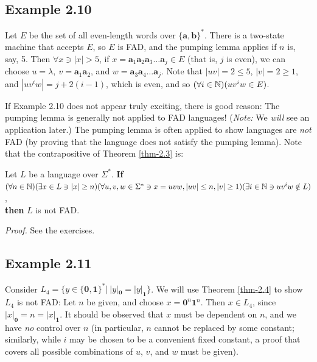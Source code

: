 \subsection*{Example 2.10}

Let $E$ be the set of all even-length words over $\{\pmb{a},\pmb{b}\}^*$. There is
a two-state machine that accepts $E$, so $E$ is FAD, and the pumping lemma
applies if $n$ is, say, 5. Then $\forall x \ni |x| > 5$, if $x = 
\pmb{a}_1\pmb{a}_2\pmb{a}_3\ldots\pmb{a}_j \in E$ (that is, $j$ is even), we can
choose $u=\lambda,\ v=\pmb{a}_1\pmb{a}_2$, and $w=\pmb{a}_3\pmb{a}_4\ldots
\pmb{a}_j$. Note that $|uv|= 2 \leq 5$, $|v| = 2 \geq 1$, and $|uv^iw|=j+2(i-1)$,
which is even, and so $(\forall i \in \mathbb{N})(uv^iw \in E)$.

If Example 2.10 does not appear truly exciting, there is good reason: The
pumping lemma is generally not applied to FAD languages! (\emph{Note:} We \emph{will}
see an application later.) The pumping lemma is often applied to show languages
are \emph{not} FAD (by proving that the language does not satisfy the pumping lemma).
Note that the contrapositive of Theorem \ref{thm-2.3} is:

\begin{thm}\label{thm-2.4}
Let $L$ be a language over $\Sigma^*$. \textbf{If} \\
$(\forall n \in \mathbb{N})(\exists x \in L \ni |x| \geq n)(\forall u,v,w \in
\Sigma^* \ni x = uvw,|uv| \leq n, |v| \geq 1)(\exists i \in \mathbb{N} \ni uv^i w
\notin L)$, \\
\textbf{then} $L$ is not FAD.

\emph{Proof.} See the exercises.
\end{thm}

\subsection*{Example 2.11}

Consider $L_4=\{y \in \{\pmb{0},\pmb{1}\}^*|\ |y|_{\pmb{0}} = |y|_{\pmb{1}}\}$. We will
use Theorem \ref{thm-2.4} to show $L_4$ is not FAD: Let $n$ be given, and choose $x =
\pmb{0}^n \pmb{1}^n$. Then $x \in L_4$, since $|x|_{\pmb{0}} = n = |x|_{\pmb{1}}$. It should be
observed that $x$ must be dependent on $n$, and we have \emph{no} control over
$n$ (in particular, $n$ cannot be replaced by some constant; similarly, while
$i$ may be chosen to be a convenient fixed constant, a proof that covers all possible
combinations of $u$, $v$, and $w$ must be given).

